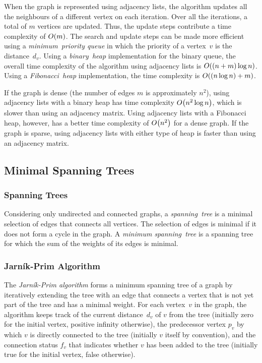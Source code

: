 When the graph is represented using adjacency lists, the algorithm updates all the neighbours of a different vertex on each iteration.
Over all the iterations, a total of \( m \) vertices are updated.
Thus, the update steps contribute a time complexity of \( O\!\left(m\right) \).
The search and update steps can be made more efficient using a \emph{minimum~priority queue} in which the priority of a vertex~\( v \) is the distance~\( d_{v} \).
Using a \emph{binary~heap} implementation for the binary queue, the overall time complexity of the algorithm using adjacency lists is \( O\!\left(\left( n + m \right) \log n\right) \).
Using a \emph{Fibonacci~heap} implementation, the time complexity is \( O\!\left(\left( n \log n \right) + m\right) \).

If the graph is dense (the number of edges \( m \) is approximately \( n^{2} \)), using adjacency lists with a binary heap has time complexity \( O\!\left(n^{2} \log n\right) \), which is slower than using an adjacency matrix.
Using adjacency lists with a Fibonacci heap, however, has a better time complexity of \( O\!\left(n^{2}\right) \) for a dense graph.
If the graph is sparse, using adjacency lists with either type of heap is faster than using an adjacency matrix.

\subsection{Minimal Spanning Trees}

\subsubsection{Spanning Trees}

Considering only undirected and connected graphs, a \emph{spanning~tree} is a minimal selection of edges that connects all vertices.
The selection of edges is minimal if it does not form a cycle in the graph.
A \emph{minimum spanning~tree} is a spanning tree for which the sum of the weights of its edges is minimal.

\subsubsection{Jarn\'{i}k-Prim Algorithm}

The \emph{Jarn\'{i}k-Prim algorithm} forms a minimum spanning tree of a graph by iteratively extending the tree with an edge that connects a vertex that is not yet part of the tree and has a minimal weight.
For each vertex~\( v \) in the graph, the algorithm keeps track of the current distance~\( d_{v} \) of \( v \) from the tree (initially zero for the initial vertex, positive infinity otherwise), the predecessor vertex \( p_{v} \) by which \( v \) is directly connected to the tree (initially \( v \) itself by convention), and the connection status \( f_{v} \) that indicates whether \( v \) has been added to the tree (initially true for the initial vertex, false otherwise).

